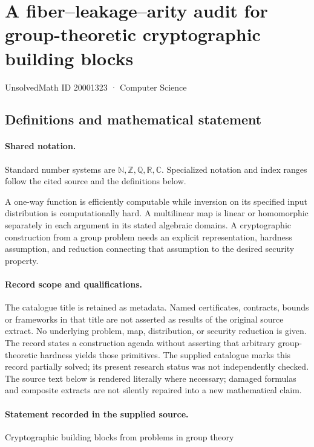 \documentclass[11pt]{article}
\begin{document}
\setcounter{section}{20001322}
\section{A fiber--leakage--arity audit for group-theoretic cryptographic building blocks}\label{20001323}
{\small\sffamily UnsolvedMath ID 20001323 · Computer Science}
\subsection{Definitions and mathematical statement}

\paragraph{Shared notation.}Standard number systems are $\mathbb N,\mathbb Z,\mathbb Q,\mathbb R,\mathbb C$. Specialized notation and index ranges follow the cited source and the definitions below.


A one-way function is efficiently computable while inversion on its specified input distribution is computationally hard. A multilinear map is linear or homomorphic separately in each argument in its stated algebraic domains. A cryptographic construction from a group problem needs an explicit representation, hardness assumption, and reduction connecting that assumption to the desired security property.
\paragraph{Record scope and qualifications.}
The catalogue title is retained as metadata. Named certificates, contracts, bounds or frameworks in that title are not asserted as results of the original source extract.
No underlying problem, map, distribution, or security reduction is given. The record states a construction agenda without asserting that arbitrary group-theoretic hardness yields those primitives. The supplied catalogue marks this record partially solved; its present research status was not independently checked.
The source text below is rendered literally where necessary; damaged formulas and composite extracts are not silently repaired into a new mathematical claim.
\paragraph{Statement recorded in the supplied source.}
Cryptographic building blocks from problems in group theory
\end{document}
